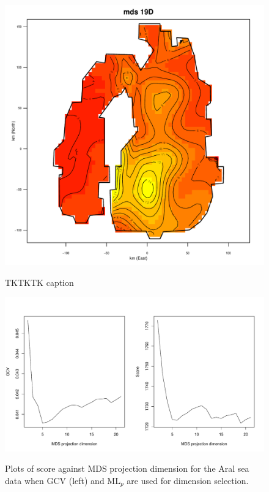 \begin{figure}
\centering
\includegraphics[width=6in]{gds/figs/aral-19d.pdf} \\
\caption{TKTKTK caption}
\label{gds-aral-19d}
\end{figure}


\begin{figure}
\centering
\includegraphics[width=6in]{gds/figs/aral-dim-scores.pdf} \\
\caption{Plots of score against MDS projection dimension for the Aral sea data when GCV (left) and $\text{ML}_p$ are used for dimension selection.}
\label{gds-aral-dim-select}
\end{figure}


